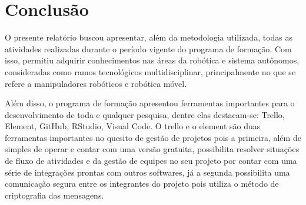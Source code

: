 \chapter{Conclusão}
\label{chap:conc}

O presente relatório buscou apresentar, além da metodologia utilizada, todas as atividades realizadas durante o período vigente do programa de formação. Com isso, permitiu adquirir conhecimentos nas áreas da robótica e sistema autônomos, consideradas como ramos tecnológicos multidisciplinar, principalmente no que se refere a manipuladores robóticos e robótica móvel.  

Além disso, o programa de formação apresentou ferramentas importantes para o desenvolvimento de toda e qualquer pesquisa, dentre elas destacam-se: Trello, Element, GitHub, RStudio, Visual Code. O trello e o element são duas ferramentas importantes no quesito de gestão de projetos pois a primeira, além de simples de operar e contar com uma versão gratuita, possibilita resolver situações de fluxo de atividades e da gestão de equipes no seu projeto por contar com uma série de integrações prontas com outros softwares, já a segunda possibilita uma comunicação segura entre os integrantes do projeto pois utiliza o método de criptografia das mensagens.







